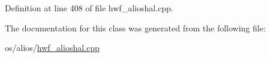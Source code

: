 Definition at line 408 of file hwf\+\_\+alioshal.\+cpp.


\begin{DoxyCode}{0}
\end{DoxyCode}


The documentation for this class was generated from the following file\+:\begin{DoxyCompactItemize}
\item 
os/alios/\mbox{\hyperlink{hwf__alioshal_8cpp}{hwf\+\_\+alioshal.\+cpp}}\end{DoxyCompactItemize}
